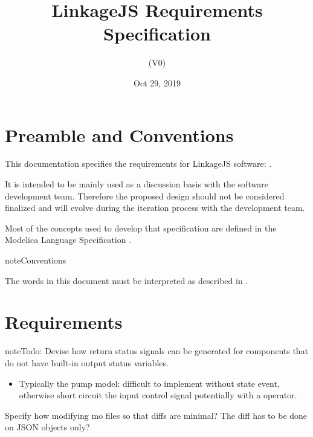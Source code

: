 \documentclass[letterpaper,10pt, openany,english]{sphinxmanual}
\title{LinkageJS Requirements Specification}
\date{Oct 29, 2019}
\author{(V0)}
\begin{document}
\pagestyle{empty}
\sphinxmaketitle
\pagestyle{plain}
\sphinxtableofcontents
\pagestyle{normal}
\label{\detokenize{index::doc}}




\pagestyle{plain}


\chapter{Preamble and Conventions}
\label{\detokenize{preamble:preamble-and-conventions}}\label{\detokenize{preamble::doc}}
This documentation specifies the requirements for LinkageJS software: .

It is intended to be mainly used as a discussion basis with the software development team.
Therefore the proposed design should not be considered finalized and will evolve during the iteration process with the development team.

Most of the concepts used to develop that specification are defined in the Modelica Language Specification .

\begin{sphinxadmonition}{note}{Conventions}

The words  in this document must be interpreted as described in .
\end{sphinxadmonition}


\chapter{Requirements}
\label{\detokenize{requirements:requirements}}\label{\detokenize{requirements:sec-requirements}}\label{\detokenize{requirements::doc}}
\begin{sphinxadmonition}{note}{\label{\detokenize{requirements:id1}}Todo:}
Devise how return status signals can be generated for components that do not have built-in output status variables.
\begin{itemize}
\item {} 
Typically the pump model: difficult to implement without state event, otherwise short circuit the input control signal potentially with a  operator.

\end{itemize}

Specify how modifying mo files so that diffs are minimal? The diff has to be done on JSON objects only?
\end{sphinxadmonition}
\end{document}
